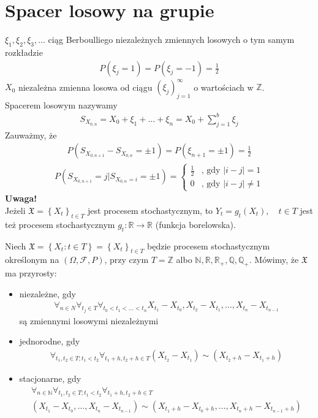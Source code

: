 \section{Spacer losowy na grupie}
$ \xi_1,\xi_2,\xi_3,\dots $ ciąg Berboulliego niezależnych zmiennych losowych o tym samym rozkładzie
\begin{gather*}
P\left(\xi_j=1\right)=P\left(\xi_j=-1\right)=\frac{1}{2}
\end{gather*}
$ X_0 $ niezależna zmienna losowa od ciągu $ \left(\xi_j\right) _{j=1}^\infty $ o wartościach w $ \mathbb Z$.\\
Spacerem losowym nazywamy
\begin{gather*}
S_{X_{0,n}}=X_0+\xi_1+\dots+\xi_n
=
X_0+\sum_{j=1}^{b}\xi_j
\end{gather*}
Zauważmy, że
\begin{gather*}
P\left(S_{X_{0,n+1}}-S_{X_{0,n}}=\pm1\right)
=
P\left(\xi_{n+1}=\pm1 \right)=\frac{1}{2}
\end{gather*}
\begin{gather*}
P\left(S_{X_{0,n+1}}=j|S_{X_{0,n}=i}=\pm1\right)
=
\left \{
\begin{array}{ll}
\frac{1}{2}&\text{, gdy }\left|i-j\right|=1\\
0&\text{, gdy }\left|i-j\right|\neq1
\end{array}
\right .
\end{gather*}
\textbf{Uwaga!}\\
Jeżeli $ \mathfrak X=\left\{X_t\right\}_{t\in T} $ jest procesem stochastycznym, to $ Y_t=g_t(X_t),\quad t\in T $ jest też procesem stochastycznym $ g_t:\mathbb R \to \mathbb R  $ (funkcja borelowska).
\begin{defi}
Niech $ \mathfrak X=\left\{X_t:t\in T\right\}=\left\{X_t\right\}_{t\in T} $ będzie procesem stochastycznym określonym na $(\Omega,\mathcal F,P)$, przy czym $ T=\mathbb Z $ albo $ \mathbb N ,\mathbb R ,\mathbb R _+,\mathbb Q,\mathbb Q_+ $. Mówimy, że $ \mathfrak X $ ma przyrosty:
\begin{itemize}
\item niezależne, gdy
\begin{gather*}
\forall_{n\in N}\forall_{t_j\in T}\forall_{t_0<t_1<\dots<t_n}
X_{t_1}-X_{t_0},X_{t_2}-X_{t_1},\dots,X_{t_n}-X_{t_{n-1}}
\end{gather*}
są zmiennymi losowymi niezależnymi
\item jednorodne, gdy
\begin{gather*}
\forall_{t_1,t_2\in T;t_1<t_2}\forall_{t_1+h,t_2+h\in T}(X_{t_2}-X_{t_1})\sim (X_{t_2+h}-X_{t_1+h})
\end{gather*}
\item stacjonarne, gdy
\begin{gather*}
\forall_{n\in \mathbb N }\forall_{t_1,t_2\in T;t_1<t_2}\forall_{t_1+h,t_2+h\in T}\\
\left(X_{t_1}-X_{t_0},\dots,X_{t_n}-X_{t_{n-1}}\right)
\sim
\left(X_{t_1+h}-X_{t_0+h},\dots,X_{t_n+h}-X_{t_{n-1}+h}\right)
\end{gather*}
\end{itemize}
\end{defi}
